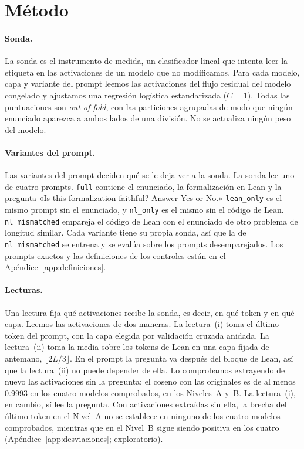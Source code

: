 \documentclass[10pt]{article}
\newcommand{\vr}[1]{\texttt{#1}}
\begin{document}
\section{Método}

\paragraph{Sonda.}
La sonda es el instrumento de medida, un clasificador lineal que intenta leer la etiqueta en las activaciones de un
modelo que no modificamos.
Para cada modelo, capa y variante del prompt leemos las activaciones del flujo residual del modelo congelado y
ajustamos una regresión logística estandarizada ($C = 1$). Todas las puntuaciones son \emph{out-of-fold}, con las
particiones agrupadas de modo que ningún enunciado aparezca a ambos lados de una división. No se actualiza ningún
peso del modelo.

\paragraph{Variantes del prompt.}
Las variantes del prompt deciden qué se le deja ver a la sonda.
La sonda lee uno de cuatro prompts. \vr{full} contiene el enunciado, la formalización en Lean y la pregunta
«Is this formalization faithful? Answer Yes or No.» \vr{lean\_only} es el mismo prompt sin el enunciado, y \vr{nl\_only} es el mismo
sin el código de Lean. \vr{nl\_mismatched} empareja el código de Lean con el enunciado de otro problema de longitud similar.
Cada variante tiene su propia sonda, así que la de \vr{nl\_mismatched} se entrena y se evalúa sobre los prompts desemparejados.
Los prompts exactos y las definiciones de los controles están en el Apéndice~\ref{app:definiciones}.

\paragraph{Lecturas.}
Una lectura fija qué activaciones recibe la sonda, es decir, en qué token y en qué capa.
Leemos las activaciones de dos maneras. La lectura~(i) toma el último token del prompt, con la capa elegida por
validación cruzada anidada. La lectura~(ii) toma la media sobre los tokens de Lean en una capa fijada de antemano,
$\lfloor 2L/3 \rfloor$.
En el prompt la pregunta va después del bloque de Lean, así que la lectura~(ii) no puede depender de ella. Lo
comprobamos extrayendo de nuevo las activaciones sin la pregunta; el coseno con las originales es de al menos 0.9993 en los cuatro modelos comprobados, en los Niveles~A y~B.
La lectura~(i), en cambio, sí lee la pregunta. Con activaciones extraídas sin ella, la brecha del último token en el
Nivel~A no se establece en ninguno de los cuatro modelos comprobados, mientras que en el Nivel~B sigue siendo positiva
en los cuatro (Apéndice~\ref{app:desviaciones}; exploratorio).
\end{document}
